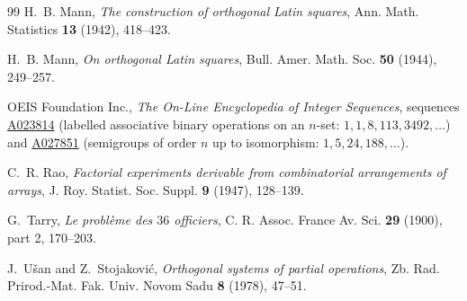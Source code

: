 \documentclass[11pt]{amsart}
\theoremstyle{remark}
\theoremstyle{definition}
\begin{document}
\begin{thebibliography}{99}
H.~B. Mann,
\emph{The construction of orthogonal Latin squares},
Ann. Math. Statistics \textbf{13} (1942), 418--423.

H.~B. Mann,
\emph{On orthogonal Latin squares},
Bull. Amer. Math. Soc. \textbf{50} (1944), 249--257.

OEIS Foundation Inc.,
\emph{The On-Line Encyclopedia of Integer Sequences},
sequences \href{https://oeis.org/A023814}{A023814} (labelled associative binary operations on an
$n$-set: $1,1,8,113,3492,\ldots$) and \href{https://oeis.org/A027851}{A027851} (semigroups of order
$n$ up to isomorphism: $1,5,24,188,\ldots$).

C.~R. Rao,
\emph{Factorial experiments derivable from combinatorial arrangements of arrays},
J. Roy. Statist. Soc. Suppl. \textbf{9} (1947), 128--139.

G.~Tarry,
\emph{Le probl\`eme des $36$ officiers},
C. R. Assoc. France Av. Sci. \textbf{29} (1900), part 2, 170--203.

J.~U\v{s}an and Z.~Stojakovi\'c,
\emph{Orthogonal systems of partial operations},
Zb. Rad. Prirod.-Mat. Fak. Univ. Novom Sadu \textbf{8} (1978), 47--51.

\end{thebibliography}
\end{document}

